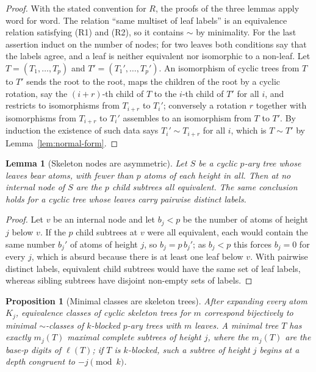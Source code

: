 \documentclass[11pt]{amsart}
\newtheorem{lemma}[theorem]{Lemma}
\newtheorem{proposition}[theorem]{Proposition}
\theoremstyle{definition}
\theoremstyle{remark}
\begin{document}
\begin{proof}
With the stated convention for $R$, the proofs of the three lemmas apply word for word.  The relation ``same multiset of leaf labels'' is an equivalence relation satisfying (R1) and (R2), so it contains $\sim$ by minimality.  For the last assertion induct on the number of nodes; for two leaves both conditions say that the labels agree, and a leaf is neither equivalent nor isomorphic to a non-leaf.  Let $T=(T_1,\ldots,T_p)$ and $T'=(T_1',\ldots,T_p')$.  An isomorphism of cyclic trees from $T$ to $T'$ sends the root to the root, maps the children of the root by a cyclic rotation, say the $(i+r)$-th child of $T$ to the $i$-th child of $T'$ for all $i$, and restricts to isomorphisms from $T_{i+r}$ to $T_i'$; conversely a rotation $r$ together with isomorphisms from $T_{i+r}$ to $T_i'$ assembles to an isomorphism from $T$ to $T'$.  By induction the existence of such data says $T_i'\sim T_{i+r}$ for all $i$, which is $T\sim T'$ by Lemma~\ref{lem:normal-form}.
\end{proof}
\begin{lemma}[Skeleton nodes are asymmetric]\label{lem:skeleton-asym}
Let $S$ be a cyclic $p$-ary tree whose leaves bear atoms, with fewer than $p$ atoms of each height in all.  Then at no internal node of $S$ are the $p$ child subtrees all equivalent.  The same conclusion holds for a cyclic tree whose leaves carry pairwise distinct labels.
\end{lemma}
\begin{proof}
Let $v$ be an internal node and let $b_j<p$ be the number of atoms of height $j$ below $v$.  If the $p$ child subtrees at $v$ were all equivalent, each would contain the same number $b_j'$ of atoms of height $j$, so $b_j=p\,b_j'$; as $b_j<p$ this forces $b_j=0$ for every $j$, which is absurd because there is at least one leaf below $v$.  With pairwise distinct labels, equivalent child subtrees would have the same set of leaf labels, whereas sibling subtrees have disjoint non-empty sets of labels.
\end{proof}
\begin{proposition}[Minimal classes are skeleton trees]\label{prop:skeleton}
After expanding every atom $K_j$, equivalence classes of cyclic skeleton trees for $m$ correspond bijectively to minimal $\sim$-classes of $k$-blocked $p$-ary trees with $m$ leaves.  A minimal tree $T$ has exactly $m_j(T)$ maximal complete subtrees of height $j$, where the $m_j(T)$ are the base-$p$ digits of $\ell(T)$; if $T$ is $k$-blocked, such a subtree of height $j$ begins at a depth congruent to $-j\pmod k$.
\end{proposition}
\end{document}
